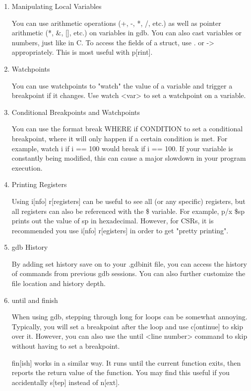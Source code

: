 \documentclass{article}
\begin{document}
	\begin{enumerate}
		\item Manipulating Local Variables

		You can use arithmetic operations (+, -, *, /, etc.) as well as pointer arithmetic (*, \&, [], etc.)
		on variables in gdb. You can also cast variables or numbers, just like in C. To access the fields of a struct,
		use {\fix .} or {\fix ->} appropriately. This is most useful with {\fix p[rint]}.

		\item Watchpoints

		You can use watchpoints to "watch" the value of a variable and trigger a breakpoint if it changes. Use
		{\fix watch <var>} to set a watchpoint on a variable.

		\item Conditional Breakpoints and Watchpoints
		
		You can use the format {\fix break WHERE if CONDITION} to set a conditional breakpoint, where
		it will only happen if a certain condition is met. For example, {\fix watch i if i == 100} would
		break if {\fix i == 100}. If your variable is constantly being modified, this can cause a major slowdown
		in your program execution.

		\item Printing Registers

		Using {\fix i[nfo] r[registers]} can be useful to see all (or any specific) registers, but all registers can also
		be referenced with the {\fix \$<register name>} variable. For example, {\fix p/x \$sp} prints out the value of {\fix sp}
		in hexadecimal. However, for CSRs, it is recommended you use {\fix i[nfo] r[egisters]} in order to get "pretty printing".

		\item gdb History

		By adding {\fix set history save on} to your {\fix .gdbinit} file, you can access the history of commands from previous gdb
		sessions. You can also further customize the file location and history depth.

		\item {\fix until} and {\fix finish}

		When using gdb, stepping through long for loops can be somewhat annoying. Typically, you will set a breakpoint after the loop
		and use {\fix c[ontinue]} to skip over it. However, you can also use the {\fix until <line number>} command to skip without having
		to set a breakpoint.

		{\fix fin[ish]} works in a similar way. It runs until the current function exits, then reports the return value of the function.
		You may find this useful if you accidentally {\fix s[tep]} instead of {\fix n[ext]}.

	\end{enumerate}


\else
\fi
\end{document}

